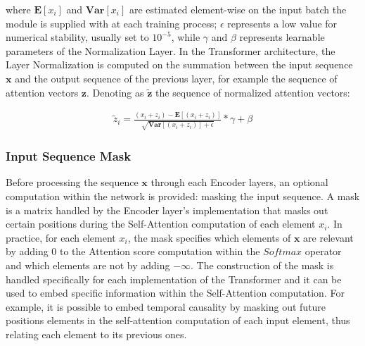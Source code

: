                 where $\mathbf{E} \left[ x_{i} \right]$ and $\mathbf{Var} \left[ x_{i} \right]$ are estimated element-wise on the input batch the module is supplied with at each training process; $\epsilon$ represents a low value for numerical stability, usually set to $10^{-5}$, while $\gamma$ and $\beta$ represents learnable parameters of the Normalization Layer. \newline
                In the Transformer architecture, the Layer Normalization is computed on the summation between the input sequence $\mathbf{x}$ and the output sequence of the previous layer, for example the sequence of attention vectors $\mathbf{z}$. Denoting as $\mathbf{\tilde{z}}$ the sequence of normalized attention vectors:
                
                \begin{align*}
                    \tilde{z}_{i} = \frac{ (x_{i} + z_{i}) - \mathbf{E} \left[ (x_{i} + z_{i}) \right]}{\sqrt{\mathbf{Var} \left[ (x_{i} + z_{i}) \right] + \epsilon}} * \gamma + \beta
                \end{align*}
            
            \subsubsection{Input Sequence Mask}
                Before processing the sequence $\mathbf{x}$ through each Encoder layers, an optional computation within the network is provided: masking the input sequence. A mask is a matrix handled by the Encoder layer's implementation that masks out certain positions during the Self-Attention computation of each element $x_{i}$. In practice, for each element $x_{i}$, the mask specifies which elements of $\mathbf{x}$ are relevant by adding 0 to the Attention score computation within the $Softmax$ operator and which elements are not by adding $-\infty$. The construction of the mask is handled specifically for each implementation of the Transformer and it can be used to embed specific information within the Self-Attention computation. For example, it is possible to embed temporal causality by masking out future positions elements in the self-attention computation of each input element, thus relating each element to its previous ones.
            
